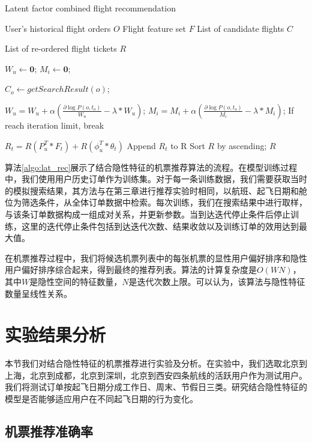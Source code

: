 \begin{algorithm}
\caption{Latent factor combined flight recommendation}
\label{algo:lat_rec}
\begin{algorithmic}[1]
\Require
\Statex User's historical flight orders $O$
\Statex Flight feature set $F$
\Statex List of candidate flights $C$

\Ensure 
\Statex List of re-ordered flight tickets $R$

\State $W_u \gets \mathbf{0}$;
\State $M_i \gets \mathbf{0}$;


\State $C_o \gets getSearchResult(o)$;

\State $W_u = W_u + \alpha(\frac{\partial \log P(o,t_o)}{W_u} - \lambda*W_u)$;
\State $M_i = M_i + \alpha(\frac{\partial \log P(o,t_o)}{M_i} - \lambda*M_i)$;
\EndFor
\State If reach iteration limit, break
\EndFor

\State $R_t = R(P_u^T * F_t) + R(\phi_u^T * \theta_t)$
\State Append $R_t$ to R
\EndFor 
\State Sort $R$ by ascending;
\State \Return $R$
\end{algorithmic}
\end{algorithm}

算法\ref{algo:lat_rec}展示了结合隐性特征的机票推荐算法的流程。在模型训练过程中，我们使用用户历史订单作为训练集。对于每一条训练数据，我们需要获取当时的模拟搜索结果，其方法与在第三章进行推荐实验时相同，以航班、起飞日期和舱位为筛选条件，从全体订单数据中检索。每次训练，我们在搜索结果中进行取样，与该条订单数据构成一组成对关系，并更新参数。当到达迭代停止条件后停止训练，这里的迭代停止条件包括到达迭代次数、结果收敛以及训练订单的效用达到最大值。

在机票推荐过程中，我们将候选机票列表中的每张机票的显性用户偏好排序和隐性用户偏好排序综合起来，得到最终的推荐列表。算法的计算复杂度是$O(WN)$，其中$W$是隐性空间的特征数量，$N$是迭代次数上限。可以认为，该算法与隐性特征数量呈线性关系。


\section{实验结果分析}

本节我们对结合隐性特征的机票推荐进行实验及分析。在实验中，我们选取北京到上海，北京到成都，北京到深圳，北京到西安四条航线的活跃用户作为测试用户。我们将测试订单按起飞日期分成工作日、周末、节假日三类。研究结合隐性特征的模型是否能够适应用户在不同起飞日期的行为变化。

\subsection{机票推荐准确率}

